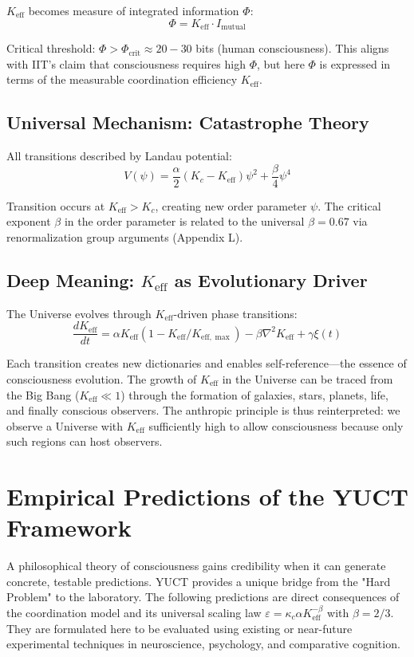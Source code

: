 \documentclass[12pt,a4paper]{article}
\newcommand{\eff}{\mathrm{eff}}
\newcommand{\Ke}{K_{\eff}}
\newcommand{\Kemax}{K_{\eff,\max}}
\begin{document}
	$\Ke$ becomes measure of integrated information $\Phi$:
	\[
	\Phi = \Ke \cdot I_{\text{mutual}}
	\]
	
	Critical threshold: $\Phi > \Phi_{\text{crit}} \approx 20-30$ bits (human consciousness). This aligns with IIT's claim that consciousness requires high $\Phi$, but here $\Phi$ is expressed in terms of the measurable coordination efficiency $\Ke$.
	
	\subsection{Universal Mechanism: Catastrophe Theory}
	
	All transitions described by Landau potential:
	\[
	V(\psi) = \frac{\alpha}{2}(K_c - \Ke)\psi^2 + \frac{\beta}{4}\psi^4
	\]
	
	Transition occurs at $\Ke > K_c$, creating new order parameter $\psi$. The critical exponent $\beta$ in the order parameter is related to the universal $\beta = 0.67$ via renormalization group arguments (Appendix L).
	
	\subsection{Deep Meaning: $\Ke$ as Evolutionary Driver}
	
	The Universe evolves through $\Ke$-driven phase transitions:
	\[
	\frac{d\Ke}{dt} = \alpha \Ke(1 - \Ke/\Kemax) - \beta \nabla^2 \Ke + \gamma \xi(t)
	\]
	
	Each transition creates new dictionaries and enables self-reference—the essence of consciousness evolution. The growth of $\Ke$ in the Universe can be traced from the Big Bang ($\Ke \ll 1$) through the formation of galaxies, stars, planets, life, and finally conscious observers. The anthropic principle is thus reinterpreted: we observe a Universe with $\Ke$ sufficiently high to allow consciousness because only such regions can host observers.
	
	\section{Empirical Predictions of the YUCT Framework}
	
	A philosophical theory of consciousness gains credibility when it can generate concrete, testable predictions. YUCT provides a unique bridge from the "Hard Problem" to the laboratory. The following predictions are direct consequences of the coordination model and its universal scaling law \(\varepsilon = \kappa_c \alpha K_{\mathrm{eff}}^{-\beta}\) with \(\beta = 2/3\). They are formulated here to be evaluated using existing or near-future experimental techniques in neuroscience, psychology, and comparative cognition.
	
\end{document}
